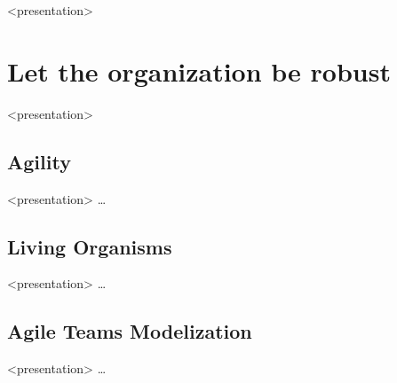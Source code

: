 
%

\begin{frame}[t,plain]
  \maketitle
\end{frame}

\begin{frame}<presentation>
  \tableofcontents
\end{frame}

\section{Let the organization be robust}

  \begin{frame}<presentation>
    \tableofcontents[currentsection]
  \end{frame}

%
\subsection{Agility}

  \begin{frame}<presentation>%
    \dots
  \end{frame}

%
\subsection{Living Organisms}

  \begin{frame}<presentation>%
    \dots
  \end{frame}

%
\subsection{Agile Teams Modelization}

  \begin{frame}<presentation>%
    \dots
  \end{frame}

